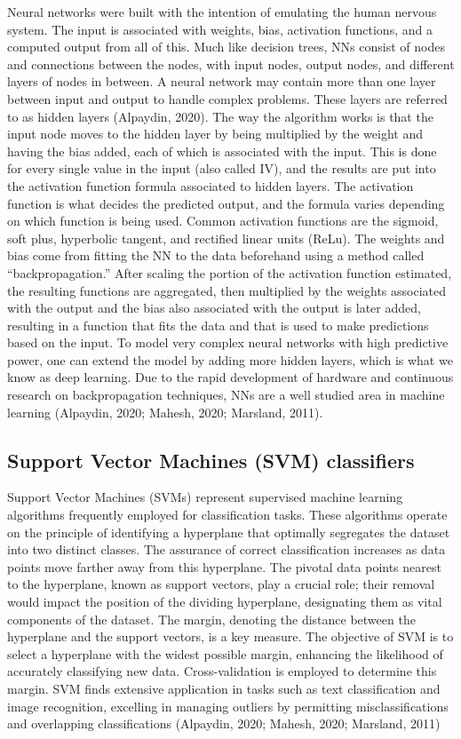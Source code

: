 \documentclass[
  man]{apa7}
\begin{document}
Neural networks were built with the intention of emulating the human nervous system. The input is associated with weights, bias, activation functions, and a computed output from all of this. Much like decision trees, NNs consist of nodes and connections between the nodes, with input nodes, output nodes, and different layers of nodes in between. A neural network may contain more than one layer between input and output to handle complex problems. These layers are referred to as hidden layers (Alpaydin, 2020).
The way the algorithm works is that the input node moves to the hidden layer by being multiplied by the weight and having the bias added, each of which is associated with the input. This is done for every single value in the input (also called IV), and the results are put into the activation function formula associated to hidden layers. The activation function is what decides the predicted output, and the formula varies depending on which function is being used. Common activation functions are the sigmoid, soft plus, hyperbolic tangent, and rectified linear units (ReLu). The weights and bias come from fitting the NN to the data beforehand using a method called ``backpropagation.'' After scaling the portion of the activation function estimated, the resulting functions are aggregated, then multiplied by the weights associated with the output and the bias also associated with the output is later added, resulting in a function that fits the data and that is used to make predictions based on the input.
To model very complex neural networks with high predictive power, one can extend the model by adding more hidden layers, which is what we know as deep learning. Due to the rapid development of hardware and continuous research on backpropagation techniques, NNs are a well studied area in machine learning (Alpaydin, 2020; Mahesh, 2020; Marsland, 2011).

\subsection{Support Vector Machines (SVM) classifiers}\label{support-vector-machines-svm-classifiers}

Support Vector Machines (SVMs) represent supervised machine learning algorithms frequently employed for classification tasks.
These algorithms operate on the principle of identifying a hyperplane that optimally segregates the dataset into two distinct classes.
The assurance of correct classification increases as data points move farther away from this hyperplane.
The pivotal data points nearest to the hyperplane, known as support vectors, play a crucial role; their removal would impact the position of the dividing hyperplane, designating them as vital components of the dataset.
The margin, denoting the distance between the hyperplane and the support vectors, is a key measure.
The objective of SVM is to select a hyperplane with the widest possible margin, enhancing the likelihood of accurately classifying new data.
Cross-validation is employed to determine this margin.
SVM finds extensive application in tasks such as text classification and image recognition, excelling in managing outliers by permitting misclassifications and overlapping classifications (Alpaydin, 2020; Mahesh, 2020; Marsland, 2011)
\end{document}
